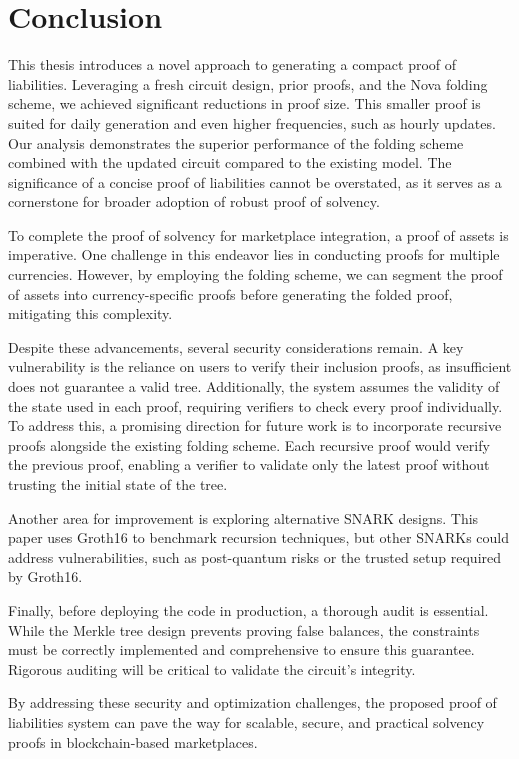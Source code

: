 
\chapter{Conclusion}

This thesis introduces a novel approach to generating a compact proof of liabilities. 
Leveraging a fresh circuit design, prior proofs, and the Nova folding scheme, we achieved significant reductions in proof size. 
This smaller proof is suited for daily generation and even higher frequencies, such as hourly updates.
Our analysis demonstrates the superior performance of the folding scheme combined with the updated circuit compared to the existing model. 
The significance of a concise proof of liabilities cannot be overstated, as it serves as a cornerstone for broader adoption of robust proof of solvency.

To complete the proof of solvency for marketplace integration, a proof of assets is imperative. 
One challenge in this endeavor lies in conducting proofs for multiple currencies. 
However, by employing the folding scheme, we can segment the proof of assets into currency-specific proofs before generating the folded proof, mitigating this complexity.

Despite these advancements, several security considerations remain. 
A key vulnerability is the reliance on users to verify their inclusion proofs, as insufficient does not guarantee a valid tree. 
Additionally, the system assumes the validity of the state used in each proof, requiring verifiers to check every proof individually. 
To address this, a promising direction for future work is to incorporate recursive proofs alongside the existing folding scheme. 
Each recursive proof would verify the previous proof, enabling a verifier to validate only the latest proof without trusting the initial state of the tree. 

Another area for improvement is exploring alternative SNARK designs. 
This paper uses Groth16 to benchmark recursion techniques, but other SNARKs could address vulnerabilities, such as post-quantum risks or the trusted setup required by Groth16. 

Finally, before deploying the code in production, a thorough audit is essential. 
While the Merkle tree design prevents proving false balances, the constraints must be correctly implemented and comprehensive to ensure this guarantee. 
Rigorous auditing will be critical to validate the circuit's integrity.

By addressing these security and optimization challenges, the proposed proof of liabilities system can pave the way for scalable, 
secure, and practical solvency proofs in blockchain-based marketplaces.